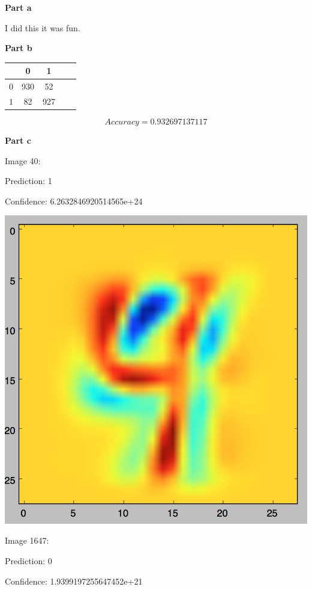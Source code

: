 \documentclass[twoside,11pt]{homework}
\begin{document}
\textbf{Part a}

I did this it was fun.

\textbf{Part b}

\begin{center}
  \begin{tabular}{c||c|c|c|c}
    & 0
    & 1 \\
    \hline
    \hline
    $0$
    & 930
    & 52
    \\
    \hline
    $1$
    & 82
    & 927
  \end{tabular}
\end{center}

\[
Accuracy = 0.932697137117
\]

\textbf{Part c}

Image 40:

Prediction: 1

Confidence: 6.2632846920514565e+24

\includegraphics[scale=.5]{images/40.png}

Image 1647:

Prediction: 0

Confidence: 1.9399197255647452e+21
\end{document}
